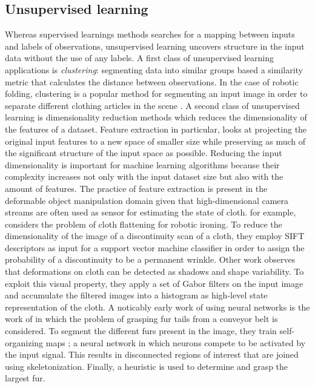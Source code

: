\documentclass[\home/main.tex]{subfiles}
\begin{document}
\subsection{Unsupervised learning}
Whereas supervised learnings methods searches for a mapping between inputs and labels of observations, unsupervised learning uncovers structure in the input data without the use of any labels.
A first class of unsupervised learning applications is \emph{clustering}: segmenting data into similar groups based a similarity metric that calculates the distance between observations. In the case of robotic folding, clustering is a popular method for segmenting an input image in order to separate different clothing articles in the scene \autocite{Doumanoglou2016,Maitin2010,Jia2018}. A second class of unsupervised learning is dimensionality reduction methods which reduces the dimensionality of the features of a dataset. Feature extraction in particular, looks at projecting the original input features to a new space of smaller size while preserving as much of the significant structure of the input space as possible. Reducing the input dimensionality is important for machine learning algorithms because their complexity increases not only with the input dataset size but also with the amount of features. 
The practice of feature extraction is present in the deformable object manipulation domain given that high-dimensional camera streams are often used as sensor for estimating the state of cloth. \textcite{li2016multi} for example, considers the problem of cloth flattening for robotic ironing. To reduce the dimensionality of the image of a discontinuity scan of a cloth, they employ SIFT descriptors \autocite{lowe1999object} as input for a support vector machine classifier in order to assign the probability of a discontinuity to be a permanent wrinkle. Other work \autocite{Jia2018} observes that deformations on cloth can be detected as shadows and shape variability. To exploit this visual property, they apply a set of Gabor filters on the input image and accumulate the filtered images into a histogram as high-level state representation of the cloth.
A noticably early work of using neural networks is the work of \textcite{Foresti2004} in which the problem of grasping fur tails from a conveyor belt is considered. To segment the different furs present in the image, they train self-organizing maps \autocite{Kohonen1982}; a neural network in which neurons compete to be activated by the input signal. This results in disconnected regions of interest that are joined using skeletonization. Finally, a heuristic is used to determine and grasp the largest fur.
\end{document}
